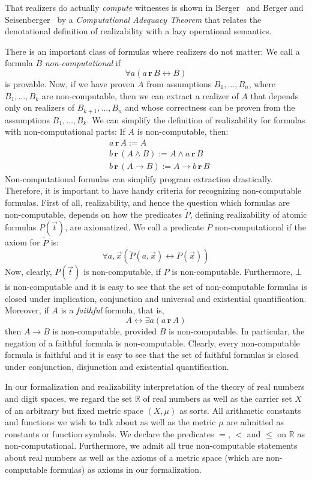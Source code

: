 \documentclass[microtype]{jloganal}
\theoremstyle{plain}
\theoremstyle{definition}
\newcommand{\RR}{\mathbb{R}}
\newcommand{\rea}[2]{#1\,\mathbf{r}\,#2}
\newcommand{\reap}[1]{\widetilde{#1}}
\begin{document}
That realizers do actually \emph{compute} witnesses is shown in 
Berger~\cite{Berger10} and Berger and Seisenberger~\cite{SeisenBerger10} by a 
\emph{Computational Adequacy Theorem} that relates the denotational 
definition of realizability with a lazy operational semantics. 

There is an important class of formulas where realizers do not matter:
We call a formula $B$ \emph{non-computational} if
\[\forall a(\rea{a}{B} \leftrightarrow B)\] 
is provable.
Now, if we have proven $A$ from assumptions $B_1,\ldots,B_n$, where 
$B_1,\ldots, B_k$ are non-computable, then we can extract a realizer 
of $A$ that depends only on realizers of $B_{k+1},\ldots,B_n$ and whose
correctness can be proven from the assumptions $B_1,\ldots,B_k$.
We can simplify the definition of realizability for formulas with 
non-computational parts: If $A$ is non-computable, then:
\begin{align*}
&\rea{a}{A} := A\\
&\rea{b}{(A \land B)} := A \land \rea{a}{B}\\
&\rea{b}{(A\to B)} := A\to \rea{b}{B}
\end{align*}
Non-computational formulas can simplify program extraction drastically.
Therefore, it is important to have handy criteria for recognizing 
non-computable formulas.
First of all, realizability, and hence the question which formulas are 
non-computable, depends on how the predicates 
$\reap{P}$, defining realizability of atomic formulas $P(\vec t)$, are
axiomatized. We call a predicate $P$ non-computational if the 
axiom for $\reap{P}$ is:
\[ \forall a,\vec x(\reap{P}(a,\vec x) \leftrightarrow P(\vec x)) \]
Now, clearly, $P(\vec t)$ is non-computable, if $P$ is non-computable. Furthermore, 
$\bot$ is non-computable and it is easy to see that the set of non-computable formulas is 
closed under implication, conjunction and universal and existential 
quantification.
Moreover, if $A$ is a \emph{faithful} formula, that is,
\[ A \leftrightarrow \exists a (\rea{a}{A})\]
then $A\to B$ is non-computable, provided $B$ is non-computable. In particular, the negation 
of a faithful formula is non-computable.
Clearly, every non-computable formula is faithful and it is easy to see that
the set of faithful formulas is closed under conjunction, disjunction and 
existential quantification.

In our formalization and realizability interpretation of the theory of real
numbers and digit spaces, we regard the set $\RR$ of real numbers as well as
the carrier set $X$ of an arbitrary but fixed metric space $(X,\mu)$ as sorts.
All arithmetic constants and functions we wish to talk about as well as the
metric $\mu$ are admitted as constants or function symbols.  We
declare the predicates $=$, $<$ and $\le$ on $\RR$ as non-computational.
Furthermore, we admit all true non-computable statements about real numbers as well as
the axioms of a metric space (which are non-computable formulas) as axioms in our
formalization.
\end{document}
